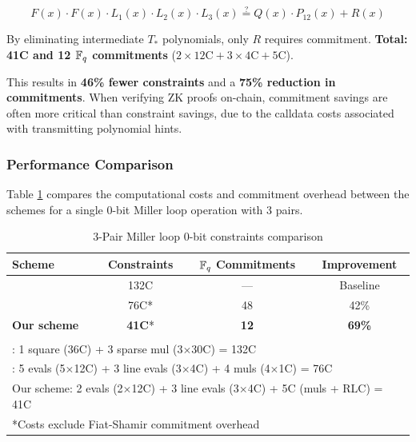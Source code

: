 $$F(x) \cdot F(x) \cdot L_1(x) \cdot L_2(x) \cdot L_3(x) \stackrel{?}{=} Q(x) \cdot P_{12}(x) + R(x)$$

By eliminating intermediate $T_*$ polynomials, only $R$ requires commitment. \textbf{Total: 41C and 12 $\mathbb{F}_q$ commitments} ($2 \times 12\text{C} + 3 \times 4\text{C} + 5\text{C}$).

\hspace{0cm}

This results in \textbf{46\% fewer constraints} and a \textbf{75\% reduction in commitments}. When verifying ZK proofs on-chain, commitment savings are often more critical than constraint savings, due to the calldata costs associated with transmitting polynomial hints.


\subsubsection{Performance Comparison}

Table \ref{tab:miller_loop_comparison} compares the computational costs and commitment overhead between the schemes for a single 0-bit Miller loop operation with 3 pairs.

\begin{table}[h]
\centering
\caption{3-Pair Miller loop 0-bit constraints comparison}
\label{tab:miller_loop_comparison}
\begin{tabular}{|l|c|c|c|}
\hline
\textbf{Scheme} & \textbf{Constraints} & \textbf{$\mathbb{F}_q$ Commitments} & \textbf{Improvement} \\
\hline
\cite{PR1CS22} & 132C & --- & Baseline \\
\hline
\cite{FXFM23} & 76C* & 48 & 42\% \\
\hline
\textbf{Our scheme} & \textbf{41C}* & \textbf{12} & \textbf{69\%} \\
\hline
\multicolumn{4}{|c|}{} \\
\multicolumn{4}{|l|}{\cite{PR1CS22}: 1 square (36C) + 3 sparse mul (3$\times$30C) = 132C} \\
\multicolumn{4}{|l|}{\cite{FXFM23}: 5 evals (5$\times$12C) + 3 line evals (3$\times$4C) + 4 muls (4$\times$1C) = 76C} \\
\multicolumn{4}{|l|}{Our scheme: 2 evals (2$\times$12C) + 3 line evals (3$\times$4C) + 5C (muls + RLC) = 41C} \\
\multicolumn{4}{|l|}{*Costs exclude Fiat-Shamir commitment overhead} \\
\hline
\end{tabular}
\end{table}


